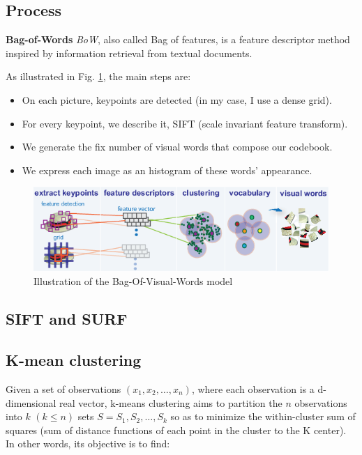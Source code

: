 \subsection{Process}

\textbf{Bag-of-Words} \textit{BoW}, also called Bag of features, is a feature descriptor method inspired by information retrieval from textual documents.

As illustrated in Fig. \ref{fig:bow_process}, the main steps are:
\begin{itemize}
    \item On each picture, keypoints are detected (in my case, I use a dense grid).
    \item For every keypoint, we describe it, SIFT (scale invariant feature transform).
    \item We generate the fix number of visual words that compose our codebook.
    \item We express each image as an histogram of these words' appearance.
\end{itemize}

\begin{figure}
    \centering
    \includegraphics[scale=0.9]{img/bow.png}
    \caption{Illustration of the Bag-Of-Visual-Words model}
    \label{fig:bow_process}
\end{figure}

\subsection{SIFT and SURF}

\subsection{K-mean clustering}

Given a set of observations $(x_1, x_2, …, x_n)$, where each observation is a d-dimensional real vector, k-means clustering aims to partition the $n$ observations into $k$ $(k \leq n)$ sets $S = {S_1, S_2, …, S_k}$ so as to minimize the within-cluster sum of squares (sum of distance functions of each point in the cluster to the K center). In other words, its objective is to find:

